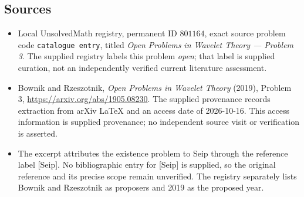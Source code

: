 \documentclass[11pt]{article}
\begin{document}
\subsection{Sources}
\begin{itemize}
\item Local UnsolvedMath registry, permanent ID \(801164\), exact source problem code \texttt{catalogue entry}, titled \emph{Open Problems in Wavelet Theory --- Problem 3}. The supplied registry labels this problem \emph{open}; that label is supplied curation, not an independently verified current literature assessment.
\item Bownik and Rzeszotnik, \emph{Open Problems in Wavelet Theory} (2019), Problem 3, \url{https://arxiv.org/abs/1905.08230}. The supplied provenance records extraction from arXiv LaTeX and an access date of 2026-10-16. This access information is supplied provenance; no independent source visit or verification is asserted.
\item The excerpt attributes the existence problem to Seip through the reference label [Seip]. No bibliographic entry for [Seip] is supplied, so the original reference and its precise scope remain unverified. The registry separately lists Bownik and Rzeszotnik as proposers and 2019 as the proposed year.
\end{itemize}
\end{document}
